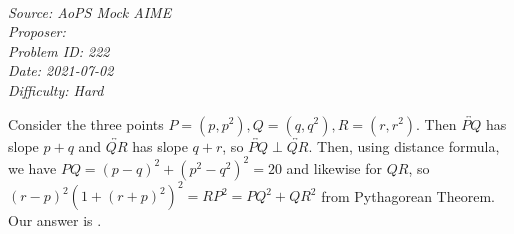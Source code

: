 \SSbreak\\
\emph{Source: AoPS Mock AIME}\\
\emph{Proposer: \Paiya}\\ %
\emph{Problem ID: 222}\\
\emph{Date: 2021-07-02}\\
\emph{Difficulty: Hard}\\
\SSbreak

\bigskip

\begin{solution}\hfil\medskip
  
    Consider the three points $P = \left(p, p^2\right), Q = \left(q, q^2\right), R = \left(r, r^2\right).$ Then $\overleftrightarrow{PQ}$ has slope $p + q$ 
	and $\overleftrightarrow{QR}$ has slope $q + r$, so $\overleftrightarrow{PQ} \perp \overleftrightarrow{QR}.$ Then, using distance formula, 
	we have $PQ = (p-q)^2 + \left(p^2 - q^2\right)^2 = 20$ and likewise for $QR$, so $(r - p)^2\left(1 + (r + p)^2\right)^2 = RP^2 = PQ^2 + QR^2$ from 
	Pythagorean Theorem. Our answer is .
\end{solution}\bigskip
